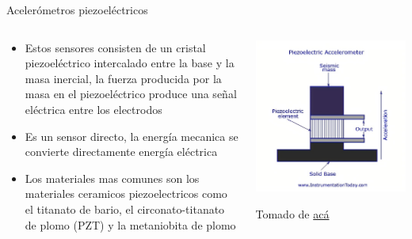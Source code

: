 \documentclass[aspectratio=169]{beamer}
\begin{document}
\begin{frame}{Acelerómetros piezoeléctricos}
    \begin{columns}[c, onlytextwidth]
        \begin{column}{0.6\textwidth}
            \begin{itemize}
                \item Estos sensores consisten de un cristal piezoeléctrico intercalado entre la base y la masa inercial, la fuerza producida por la masa en el piezoeléctrico produce una señal eléctrica entre los electrodos
                \item Es un sensor directo, la energía mecanica se convierte directamente energía eléctrica
                \item Los materiales mas comunes son los materiales ceramicos piezoelectricos como el titanato de bario, el circonato-titanato de plomo (PZT) y la metaniobita de plomo
            \end{itemize}
        \end{column}
        \begin{column}{0.4\textwidth}
            \centering
            \includegraphics[width = 1\linewidth]{fig/Fuerza_Vibracion/piezo.jpg}
            
            \tiny{Tomado de \href{www.instrumentationtoday.com}{acá}}
        \end{column}
    \end{columns}
\end{frame}
\end{document}
